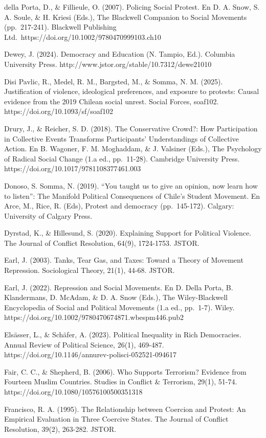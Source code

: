 \documentclass[
  13pt,
]{article}
\begin{document}
della Porta, D., \& Fillieule, O. (2007). Policing Social Protest. En D.
A. Snow, S. A. Soule, \& H. Kriesi (Eds.), The Blackwell Companion to
Social Movements (pp.~217-241). Blackwell Publishing
Ltd.~https://doi.org/10.1002/9780470999103.ch10

Dewey, J. (2024). Democracy and Education (N. Tampio, Ed.). Columbia
University Press. http://www.jstor.org/stable/10.7312/dewe21010

Disi Pavlic, R., Medel, R. M., Bargsted, M., \& Somma, N. M. (2025).
Justification of violence, ideological preferences, and exposure to
protests: Causal evidence from the 2019 Chilean social unrest. Social
Forces, soaf102. https://doi.org/10.1093/sf/soaf102

Drury, J., \& Reicher, S. D. (2018). The Conservative Crowd?: How
Participation in Collective Events Transforms Participants'
Understandings of Collective Action. En B. Wagoner, F. M. Moghaddam, \&
J. Valsiner (Eds.), The Psychology of Radical Social Change (1.a ed.,
pp.~11-28). Cambridge University Press.
https://doi.org/10.1017/9781108377461.003

Donoso, S. Somma, N. (2019). ``You taught us to give an opinion, now
learn how to listen'': The Manifold Political Consequences of Chile's
Student Movement. En Arce, M., Rice, R. (Eds), Protest and democracy
(pp.~145-172). Calgary: University of Calgary Press.

Dyrstad, K., \& Hillesund, S. (2020). Explaining Support for Political
Violence. The Journal of Conflict Resolution, 64(9), 1724-1753. JSTOR.

Earl, J. (2003). Tanks, Tear Gas, and Taxes: Toward a Theory of Movement
Repression. Sociological Theory, 21(1), 44-68. JSTOR.

Earl, J. (2022). Repression and Social Movements. En D. Della Porta, B.
Klandermans, D. McAdam, \& D. A. Snow (Eds.), The Wiley-Blackwell
Encyclopedia of Social and Political Movements (1.a ed., pp.~1-7).
Wiley. https://doi.org/10.1002/9780470674871.wbespm446.pub2

Elsässer, L., \& Schäfer, A. (2023). Political Inequality in Rich
Democracies. Annual Review of Political Science, 26(1), 469-487.
https://doi.org/10.1146/annurev-polisci-052521-094617

Fair, C. C., \& Shepherd, B. (2006). Who Supports Terrorism? Evidence
from Fourteen Muslim Countries. Studies in Conflict \& Terrorism, 29(1),
51-74. https://doi.org/10.1080/10576100500351318

Francisco, R. A. (1995). The Relationship between Coercion and Protest:
An Empirical Evaluation in Three Coercive States. The Journal of
Conflict Resolution, 39(2), 263-282. JSTOR.
\end{document}
